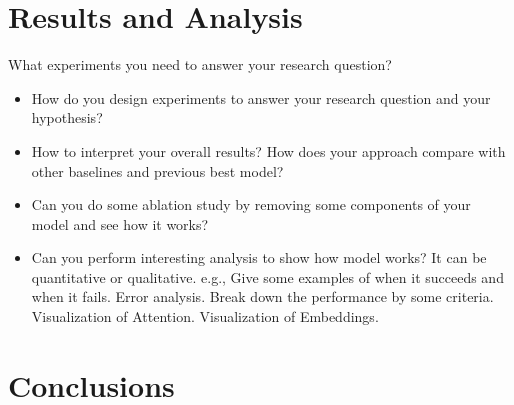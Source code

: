 \documentclass[11pt]{article}
\begin{document}
\section{Results and Analysis}
What experiments you need to answer your research question?
\begin{itemize}
\item How do you design experiments to answer your research question and your hypothesis?
\item How to interpret your overall results? How does your approach compare with other baselines and previous best model?
\item Can you do some ablation study by removing some components of your model and see how it works?
\item Can you perform interesting analysis to show how model works? It can be quantitative or qualitative. e.g., Give some examples of when it succeeds and when it fails. Error analysis. Break down the performance by some criteria. Visualization of Attention. Visualization of Embeddings.
\end{itemize}

\section{Conclusions}




\end{document}
